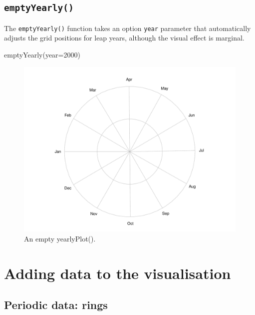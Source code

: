 \documentclass[
]{book}
\newenvironment{Shaded}{\begin{snugshade}}{\end{snugshade}}
\newcommand{\AttributeTok}[1]{\textcolor[rgb]{0.77,0.63,0.00}{#1}}
\newcommand{\DecValTok}[1]{\textcolor[rgb]{0.00,0.00,0.81}{#1}}
\newcommand{\FunctionTok}[1]{\textcolor[rgb]{0.00,0.00,0.00}{#1}}
\newcommand{\NormalTok}[1]{#1}
\begin{document}
\hypertarget{emptyyearly}{%
\subsection{\texorpdfstring{\texttt{emptyYearly()}}{emptyYearly()}}\label{emptyyearly}}

The \texttt{emptyYearly()} function takes an option \texttt{year} parameter that automatically adjusts the grid positions for leap years, although the visual effect is marginal.

\begin{Shaded}
\begin{Highlighting}[]
\FunctionTok{emptyYearly}\NormalTok{(}\AttributeTok{year=}\DecValTok{2000}\NormalTok{)}
\end{Highlighting}
\end{Shaded}

\begin{figure}

{\centering \includegraphics[width=0.9\linewidth]{_main_files/figure-latex/emptyYearly-1} 

}

\caption{An empty yearlyPlot().}\label{fig:emptyYearly}
\end{figure}

\hypertarget{adding-to-cyclical}{%
\section{Adding data to the visualisation}\label{adding-to-cyclical}}

\hypertarget{periodic-data-rings}{%
\subsection{Periodic data: rings}\label{periodic-data-rings}}
\end{document}
